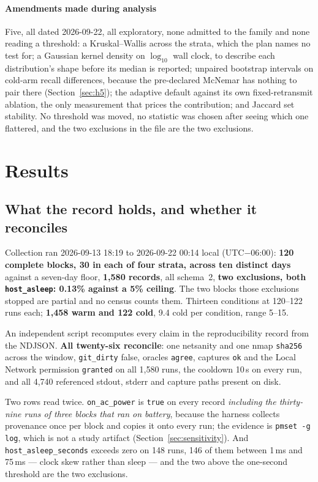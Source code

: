 \documentclass[conference]{IEEEtran}
\newcommand{\netsanity}{\textsf{netsanity}}
\begin{document}
\paragraph*{Amendments made during analysis} Five, all dated 2026-09-22, all
exploratory, none admitted to the family and none reading a threshold: a
Kruskal--Wallis across the strata, which the plan names no test for; a Gaussian
kernel density on $\log_{10}$ wall clock, to describe each distribution's shape
before its median is reported; unpaired bootstrap intervals on cold-arm recall
differences, because the pre-declared McNemar has nothing to pair there
(Section~\ref{sec:h5}); the adaptive default against its own fixed-retransmit
ablation, the only measurement that prices the contribution; and Jaccard set
stability. No threshold was moved, no statistic was chosen after seeing which
one flattered, and the two exclusions in the file are the two exclusions.

\section{Results}
\label{sec:results}

\subsection{What the record holds, and whether it reconciles}
\label{sec:record}

Collection ran 2026-09-13 18:19 to 2026-09-22 00:14 local (UTC$-$06:00):
\textbf{120 complete blocks, 30 in each of four strata, across ten distinct
days} against a seven-day floor, \textbf{1{,}580 records}, all schema~2,
\textbf{two exclusions, both \texttt{host\_asleep}: 0.13\% against a 5\%
ceiling}. The two blocks those exclusions stopped are partial and no census
counts them. Thirteen conditions at 120--122 runs each; \textbf{1{,}458 warm
and 122 cold}, 9.4 cold per condition, range 5--15.

An independent script recomputes every claim in the reproducibility record from
the NDJSON. \textbf{All twenty-six reconcile}: one \netsanity{} and one nmap
\texttt{sha256} across the window, \texttt{git\_dirty} false, oracles
\texttt{agree}, captures \texttt{ok} and the Local Network permission
\texttt{granted} on all 1{,}580 runs, the cooldown 10\,s on every run, and all
4{,}740 referenced stdout, stderr and capture paths present on disk.

Two rows read twice. \texttt{on\_ac\_power} is \texttt{true} on every record
\emph{including the thirty-nine runs of three blocks that ran on battery},
because the harness collects provenance once per block and copies it onto every
run; the evidence is \texttt{pmset -g log}, which is not a study artifact
(Section~\ref{sec:sensitivity}). And \texttt{host\_asleep\_seconds} exceeds
zero on 148 runs, 146 of them between 1\,ms and 75\,ms --- clock skew rather
than sleep --- and the two above the one-second threshold are the two
exclusions.
\end{document}
